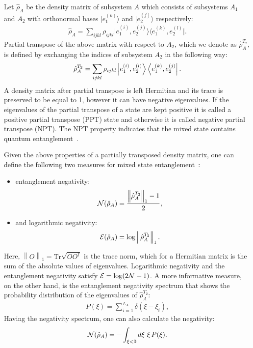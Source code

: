 \documentclass[aps,pra,reprint,superscriptaddress,twocolumn,notitlepage]{revtex4-1}
\newcommand{\Tr}{\text{Tr}}
\newcommand{\rTa}{{\hat\rho^{T_2}_A} }
\newcommand{\norm}[1]{\left\lVert#1\right\rVert}
\newcommand{\bigket}[1]{ {\big|{#1}\big\rangle} }
\newcommand{\bigbra}[1]{ {\big\langle{#1}\big|} }
\numberwithin{equation}{section}
\begin{document}
Let $\hat\rho_A$ be the density matrix of subsystem $A$ which consists of subsystems $A_1$ and $A_2$ with orthonormal bases
$\bigket{e_1^{(k)}}$ and $\bigket{e_2^{(j)}} $ respectively:
\begin{align}
\hat\rho_A=\sum_{ijkl} \rho_{ijkl} \bigket{e_1^{(i)}, e_2^{(j)}}   
 \bigbra{e_1^{(k)}, e_2^{(l)}}.
\end{align}
Partial transpose of the above matrix with respect to $A_2$, which we denote as $\hat\rho_A^{T_2}$, is defined by exchanging the indices of subsystem $A_2$ in the following way:
\begin{align} \label{eq:rTb}
\hat\rho_A^{T_2}=\sum_{ijkl} \rho_{ijkl} \Ket{e_1^{(i)}, e_2^{(l)}}  \Bra{e_1^{(k)}, e_2^{(j)}}.
\end{align}
A density matrix after partial transpose is left Hermitian and its trace is preserved to be equal to 1, however it can have negative eigenvalues. If the eigenvalues of the partial transpose of a state are kept positive it is called a positive partial transpose (PPT) state and otherwise it is called negative partial transpose (NPT). The NPT property indicates that the mixed state contains quantum entanglement~\cite{Peres1996, Horodecki1996}.

Given the above properties of a partially transposed density matrix, one can define the following two measures for mixed state entanglement~\cite{PlenioEisert1999,Vidal2002,Plenio2005}:
\begin{itemize}
\item entanglement negativity:
 \begin{align} 
 \label{eq:neg_def}
{\cal N}(\hat\rho_A) &= \frac{\norm{\rTa }_1 -1}{2}, 
\end{align}
\item and logarithmic negativity:
 \begin{align} 
 \label{eq:logneg_def}
{\cal E} (\hat\rho_A) &= \log \norm{\rTa }_1.
\end{align}
\end{itemize}
Here, $\norm{O}_1= \Tr \sqrt{OO^\dag}$ is the trace norm, which for a Hermitian matrix is the sum of the absolute values of eigenvalues. %
Logarithmic negativity and the entanglement negativity satisfy ${\cal E}=\log (2{\cal N}+1)$.
A more informative measure, on the other hand, is the entanglement negativity spectrum that shows the probability distribution of the eigenvalues of $\rTa$:
\begin{align} \label{eq:PTdist}
P (\xi)=\sum_{i=1}^{L_A} \delta(\xi-\xi_i),
\end{align}
Having the negativity spectrum, one can also calculate the negativity:
\begin{align}
\label{eq:neg_dist}
 {\cal N}(\hat\rho_A)   =  -\int_{\xi<0} d\xi\ \xi\, P(\xi).
\end{align}
\end{document}
